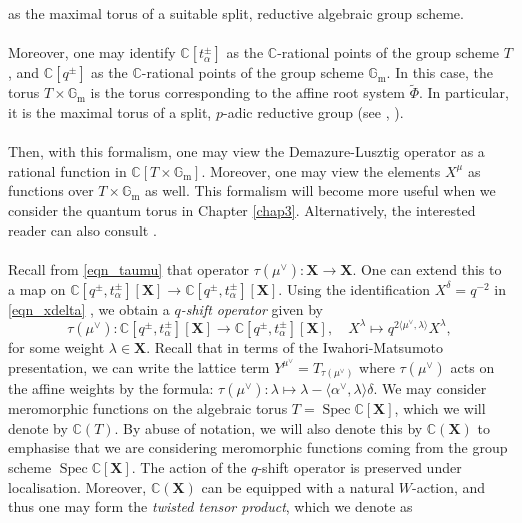 \documentclass[a4paper]{report}
\theoremstyle{theorem}
\theoremstyle{definition}
\theoremstyle{remark}
\theoremstyle{proposition}
\theoremstyle{conjecture}
\theoremstyle{lemma}
\theoremstyle{corollary}
\theoremstyle{exercise}
\theoremstyle{example}
\newcommand{\C}{\mathbb{C}}
\newcommand{\on}{\operatorname}
\newcommand{\spec}{\on{Spec}}
\begin{document}
  as the maximal torus of a suitable split, reductive algebraic group scheme.\\\\
  Moreover, one may identify $\C[t_\alpha^\pm]$ as the $\C$-rational 
  points of the group
  scheme $T$, and $\C[q^\pm]$ as the $\C$-rational points of the group scheme
  $\mathbb{G}_{\on{m}}$. In this case, the torus $T \times \mathbb{G}_{\on{m}}$
  is the torus corresponding to the affine root system $\widetilde{\Phi}$.
  In particular, it is the maximal torus of a split, $p$-adic
  reductive group (see \cite{cai22}, \cite{hkp10}).\\\\
  Then, with this formalism, one may view 
  the Demazure-Lusztig operator as a rational function in 
  $\C[T \times \mathbb{G}_{\on{m}}]$. Moreover, one may view the elements 
  $X^\mu$ as functions over $T\times \mathbb{G}_{\on{m}}$ as well. 
  This formalism will become more useful
  when we consider the quantum torus in Chapter \ref{chap3}. Alternatively,
  the interested reader can also consult \cite[\S 5, \S6]{beg00}.\\\\
  Recall from \eqref{eqn_taumu} that operator $\tau(\mu^\vee) : \mathbf{X} \to \mathbf{X}$.
  One can extend this to a map on $\C[q^\pm,t_\alpha^\pm][\mathbf{X}] \to \C[q^\pm,t_\alpha^\pm][\mathbf{X}]$.
  Using the identification $X^\delta = q^{-2}$ in \eqref{eqn_xdelta} , we obtain 
  a \emph{$q$-shift operator} given by 
  \begin{equation}\label{eqn_shift_operator}
      \tau(\mu^\vee) : \C[q^\pm,t_\alpha^\pm][\mathbf{X}] \longrightarrow \C[q^\pm,t_\alpha^\pm][\mathbf{X}], \quad X^\lambda \longmapsto q^{2\langle \mu^\vee,\lambda\rangle} X^\lambda,
  \end{equation}
  for some weight $\lambda \in \mathbf{X}$.
  Recall that in terms of the Iwahori-Matsumoto presentation, we can write the lattice term $Y^{\mu^\vee} = T_{\tau(\mu^\vee)}$
  where $\tau(\mu^\vee)$ acts on the affine weights by the formula:
  $\tau(\mu^\vee) : \lambda \mapsto \lambda - \langle \alpha^\vee, \lambda\rangle\delta$. 
  We may consider meromorphic functions on the algebraic torus $T = \spec \C[\mathbf{X}]$, which we will 
  denote by $\C(T)$. By abuse of notation, we will also denote this by $\C(\mathbf{X})$ to emphasise that we 
  are considering meromorphic functions coming from the group scheme $\spec \C[\mathbf{X}]$.
  The action of the 
  $q$-shift operator is preserved under localisation. Moreover, $\C(\mathbf{X})$ 
  can be equipped with a natural $W$-action, and thus one may form the \emph{twisted
  tensor product}, which we denote as 
\end{document}
